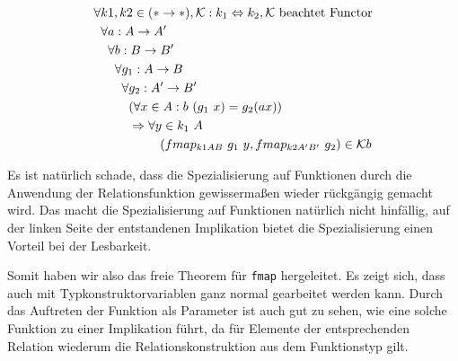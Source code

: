 %
\begin{align*}
&\forall k1, k2 \in (* \rightarrow *), \mathcal{K} : k_1 \Leftrightarrow k_2, \mathcal{K}~\text{beachtet Functor} \\
&\hphantom{\forall} \forall a : A \rightarrow A' \\
&\hphantom{\forall \forall} \forall b : B \rightarrow B' \\
&\hphantom{\forall \forall \forall} \forall g_1 : A \rightarrow B\\
& \hphantom{\forall \forall \forall \forall} \forall g_2 : A' \rightarrow B' \\
& \hphantom{\forall \forall \forall \forall \forall} (\forall x \in A : b\ (g_1\ x) = g_2 (a x))\\
& \hphantom{\forall \forall \forall \forall \forall} \Rightarrow \forall y \in k_1\ A\\
&\hphantom{\forall \forall \forall \forall ( \forall \Rightarrow \forall} (fmap_{k1 A B}\ g_1\ y, fmap_{k2 A' B'}\ g_2) \in \mathcal{K} b
\end{align*}

Es ist natürlich schade, dass die Spezialisierung auf Funktionen durch die Anwendung der Relationsfunktion gewissermaßen wieder
rückgängig gemacht wird.
Das macht die Spezialisierung auf Funktionen natürlich nicht hinfällig, auf der linken Seite der entstandenen Implikation bietet die
Spezialisierung einen Vorteil bei der Lesbarkeit.

Somit haben wir also das freie Theorem für \texttt{fmap} hergeleitet. Es zeigt sich, dass auch mit Typkonstruktorvariablen ganz normal
gearbeitet werden kann. Durch das Auftreten der Funktion als Parameter ist auch gut zu sehen, wie eine solche Funktion
zu einer Implikation führt, da für Elemente der entsprechenden Relation wiederum die Relationskonstruktion aus dem Funktionstyp
gilt.

